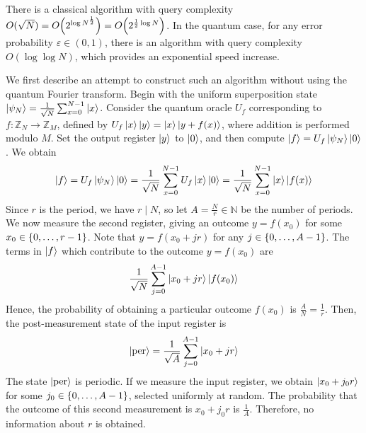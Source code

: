 There is a classical algorithm with query complexity \( O(\sqrt{N}) = O\qty(2^{\log N^{\frac{1}{2}}}) = O\qty(2^{\frac{1}{2} \log N}) \).
In the quantum case, for any error probability \( \varepsilon \in (0,1) \), there is an algorithm with query complexity \( O(\log \log N) \), which provides an exponential speed increase.

We first describe an attempt to construct such an algorithm without using the quantum Fourier transform.
Begin with the uniform superposition state \( \ket{\psi_N} = \frac{1}{\sqrt{N}} \sum_{x=0}^{N-1} \ket{x} \).
Consider the quantum oracle \( U_f \) corresponding to \( f \colon \mathbb Z_N \to \mathbb Z_M \), defined by \( U_f \ket{x} \ket{y} = \ket{x} \ket{y + f(x)} \), where addition is performed modulo \( M \).
Set the output register \( \ket{y} \) to \( \ket{0} \), and then compute \( \ket{f} = U_f \ket{\psi_N} \ket{0} \).
We obtain
\[ \ket{f} = U_f \ket{\psi_N} \ket{0} = \frac{1}{\sqrt{N}} \sum_{x=0}^{N-1} U_f \ket{x} \ket{0} = \frac{1}{\sqrt{N}} \sum_{x=0}^{N-1} \ket{x} \ket{f(x)} \]
Since \( r \) is the period, we have \( r \mid N \), so let \( A = \frac{N}{r} \in \mathbb N \) be the number of periods.
We now measure the second register, giving an outcome \( y = f(x_0) \) for some \( x_0 \in \qty{0, \dots, r-1} \).
Note that \( y = f(x_0 + jr) \) for any \( j \in \qty{0, \dots, A-1} \).
The terms in \( \ket{f} \) which contribute to the outcome \( y = f(x_0) \) are
\[ \frac{1}{\sqrt{N}} \sum_{j=0}^{A-1} \ket{x_0 + jr} \ket{f(x_0)} \]
Hence, the probability of obtaining a particular outcome \( f(x_0) \) is \( \frac{A}{N} = \frac{1}{r} \).
Then, the post-measurement state of the input register is
\[ \ket{\text{per}} = \frac{1}{\sqrt{A}} \sum_{j=0}^{A-1} \ket{x_0 + jr} \]
The state \( \ket{\text{per}} \) is periodic.
If we measure the input register, we obtain \( \ket{x_0 + j_0 r} \) for some \( j_0 \in \qty{0, \dots, A-1} \), selected uniformly at random.
The probability that the outcome of this second measurement is \( x_0 + j_0 r \) is \( \frac{1}{A} \).
Therefore, no information about \( r \) is obtained.

